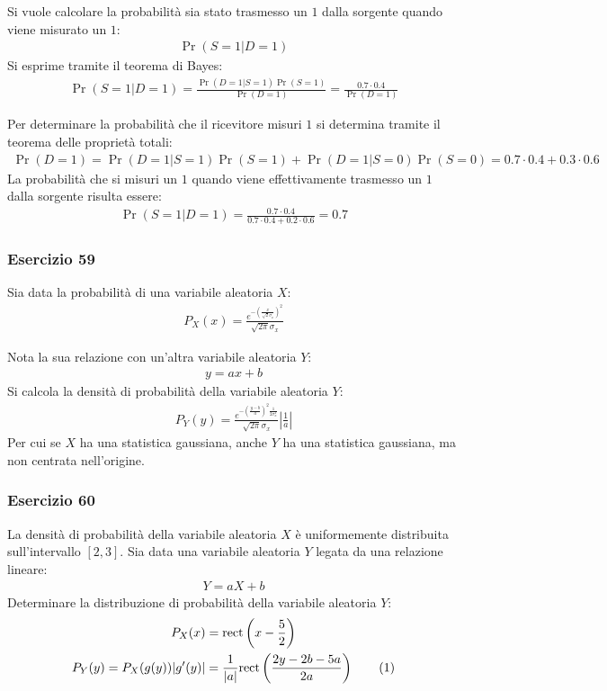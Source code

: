 \documentclass{article}
\newcommand{\rect}{\mathrm{rect}}
\newcommand{\tageq}{\tag{\stepcounter{equation}\theequation}}
\begin{document}
Si vuole calcolare la probabilità sia stato trasmesso un $1$ dalla sorgente quando viene misurato un $1$:
\begin{gather*}
    \Pr(S=1|D=1)
\end{gather*}
Si esprime tramite il teorema di Bayes:
\begin{gather*}
    \Pr(S=1|D=1)=\displaystyle\frac{\Pr(D=1|S=1)\Pr(S=1)}{\Pr(D=1)}=\frac{0.7\cdot0.4}{\Pr(D=1)}
\end{gather*}

Per determinare la probabilità che il ricevitore misuri $1$ si determina tramite il teorema delle proprietà totali:
\begin{gather*}
    \Pr(D=1)=\Pr(D=1|S=1)\Pr(S=1)+\Pr(D=1|S=0)\Pr(S=0)=0.7\cdot0.4+0.3\cdot0.6
\end{gather*}
La probabilità che si misuri un $1$ quando viene effettivamente trasmesso un $1$ dalla sorgente risulta essere:
\begin{gather}
    \Pr(S=1|D=1)=\displaystyle\frac{0.7\cdot0.4}{0.7\cdot0.4+0.2\cdot0.6}=0.7
\end{gather}

\subsubsection*{Esercizio 59}

Sia data la probabilità di una variabile aleatoria $X$:
\begin{gather*}
    P_X(x)=\displaystyle\frac{e^{-\left(\frac{x}{\sqrt{2}{\sigma_x}}\right)^2}}{\sqrt{2\pi}\sigma_x}
\end{gather*}

Nota la sua relazione con un'altra variabile aleatoria $Y$:
\begin{gather*}
    y=ax+b
\end{gather*}
Si calcola la densità di probabilità della variabile aleatoria $Y$:
\begin{gather}
    P_Y(y)=\displaystyle\frac{e^{-\left(\frac{y-b}{a}\right)^2\frac{1}{2\sigma_x^2}}}{\sqrt{2\pi}\sigma_x}\left|\frac{1}{a}\right|
\end{gather}
Per cui se $X$ ha una statistica gaussiana, anche $Y$ ha una statistica gaussiana, ma non centrata nell'origine. 

\subsubsection*{Esercizio 60}

La densità di probabilità della variabile aleatoria $X$ è uniformemente distribuita sull'intervallo $[2,3]$. Sia data una variabile aleatoria $Y$ legata da una relazione 
lineare:
\begin{gather*}
    Y=aX+b
\end{gather*}
Determinare la distribuzione di probabilità della variabile aleatoria $Y$:
\begin{gather*}
    P_X(x)=\rect\left(x-\displaystyle\frac{5}{2}\right)\\
    P_Y(y)=P_X(g(y))|g'(y)|=\displaystyle\frac{1}{|a|}\rect\left(\frac{2y-2b-5a}{2a}\right)\tageq
\end{gather*}
\end{document}
